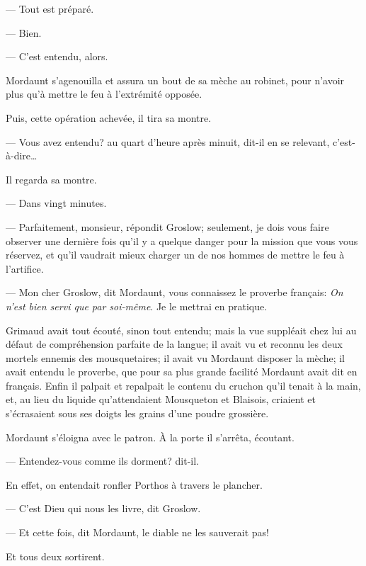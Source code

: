 — Tout est préparé.

— Bien.

— C'est entendu, alors.

Mordaunt s'agenouilla et assura un bout de sa mèche au robinet, pour n'avoir plus qu'à mettre le feu à l'extrémité opposée.

Puis, cette opération achevée, il tira sa montre.

— Vous avez entendu? au quart d'heure après minuit, dit-il en se relevant, c'est-à-dire\dots

Il regarda sa montre.

— Dans vingt minutes.

— Parfaitement, monsieur, répondit Groslow; seulement, je dois vous faire observer une dernière fois qu'il y a quelque danger pour la mission que vous vous réservez, et qu'il vaudrait mieux charger un de nos hommes de mettre le feu à l'artifice.

— Mon cher Groslow, dit Mordaunt, vous connaissez le proverbe français: \textit{On n'est bien servi que par soi-même}. Je le mettrai en pratique.

Grimaud avait tout écouté, sinon tout entendu; mais la vue suppléait chez lui au défaut de compréhension parfaite de la langue; il avait vu et reconnu les deux mortels ennemis des mousquetaires; il avait vu Mordaunt disposer la mèche; il avait entendu le proverbe, que pour sa plus grande facilité Mordaunt avait dit en français. Enfin il palpait et repalpait le contenu du cruchon qu'il tenait à la main, et, au lieu du liquide qu'attendaient Mousqueton et Blaisois, criaient et s'écrasaient sous ses doigts les grains d'une poudre grossière.

Mordaunt s'éloigna avec le patron. À la porte il s'arrêta, écoutant.

— Entendez-vous comme ils dorment? dit-il.

En effet, on entendait ronfler Porthos à travers le plancher.

— C'est Dieu qui nous les livre, dit Groslow.

— Et cette fois, dit Mordaunt, le diable ne les sauverait pas!

Et tous deux sortirent.
